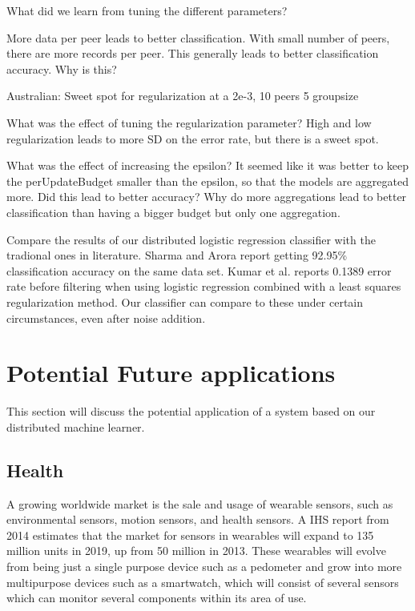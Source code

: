 What did we learn from tuning the different parameters?

More data per peer leads to better classification. With small number of peers, there are more records per peer. This generally leads to better classification accuracy. Why is this? 

Australian: Sweet spot for regularization at a 2e-3, 10 peers 5 groupsize

What was the effect of tuning the regularization parameter? High and low regularization leads to more SD on the error rate, but there is a sweet spot.

What was the effect of increasing the epsilon? 
	It seemed like it was better to keep the perUpdateBudget smaller than the epsilon, so that the models are aggregated more. Did this lead to better accuracy? Why do more aggregations lead to better classification than having a bigger budget but only one aggregation.
	
Compare the results of our distributed logistic regression classifier with the tradional ones in literature. Sharma and Arora \cite{sharma2013adaptive} report getting 92.95\% classification accuracy on the same data set. Kumar et al\cite{kumar2012comparative}. reports  0.1389 error rate before filtering when using logistic regression combined with a least squares regularization method. Our classifier can compare to these under certain circumstances, even after noise addition.  



\section{Potential Future applications}
This section will discuss the potential application of a system based on our distributed machine learner.

\subsection{Health}
A growing worldwide market is the sale and usage of wearable sensors, such as environmental sensors, motion sensors, and health sensors. A IHS report \cite{ihs2014reportwearables} from 2014 estimates that the market for sensors in wearables will expand to 135 million units in 2019, up from 50 million in 2013. These wearables will evolve from being just a single purpose device such as a pedometer and grow into more multipurpose devices such as a smartwatch, which will consist of several sensors which can monitor several components within its area of use. 

